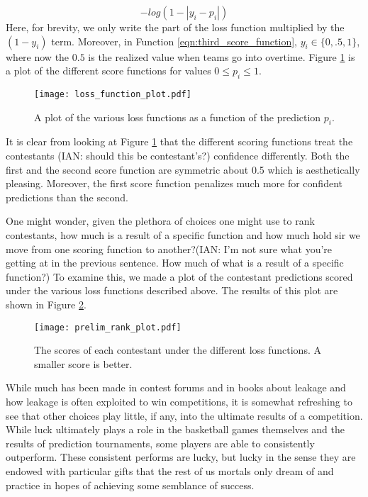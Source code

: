 \begin{equation}\label{eqn:third_score_function}
-log(1-|y_i-p_i|)
\end{equation} 
Here, for brevity, we only write the part of the loss function multiplied by the $(1-y_i)$ term. Moreover, in Function \ref{eqn:third_score_function}, $y_i \in \{0,.5,1\}$, where now the $0.5$ is the realized value when teams go into overtime. Figure \ref{fig:scoring_functions} is a plot of the different score functions for values $0\leq p_i \leq 1$.  

\begin{figure}[h]
\centering
\texttt{[image: loss\_function\_plot.pdf]}
\caption{A plot of the various loss functions as a function of the prediction $p_i$.  }
\label{fig:scoring_functions}
\end{figure}

It is clear from looking at Figure \ref{fig:scoring_functions} that the different scoring functions treat the contestants (IAN: should this be contestant's?) confidence differently. Both the first and the second score function are symmetric about 0.5 which is aesthetically pleasing. Moreover, the first score function penalizes much more for confident predictions than the second. 

One might wonder, given the plethora of choices one might use to rank contestants, how much is a result of a specific function and how much hold sir we move from one scoring function to another?(IAN: I'm not sure what you're getting at in the previous sentence. How much of what is a result of a specific function?) To examine this, we made a plot of the contestant predictions scored under the various loss functions described above. The results of this plot are shown in Figure \ref{fig:score_rank_plot}. 

  \begin{figure}[h]
\centering
\texttt{[image: prelim\_rank\_plot.pdf]}
\caption{The scores of each contestant under the different loss functions. A smaller score is better.  }
\label{fig:score_rank_plot}
\end{figure}


While much has been made in contest forums and in books \cite{schutt2013doing} about leakage and how leakage is often exploited to win competitions, it is somewhat refreshing to see that other choices play little, if any, into the ultimate results of a competition. While luck ultimately plays a role in the basketball games themselves and the results of prediction tournaments, some players are able to consistently outperform. These consistent performs are lucky, but lucky in the sense they are endowed with particular gifts that the rest of us mortals only dream of and practice in hopes of achieving some semblance of success.  